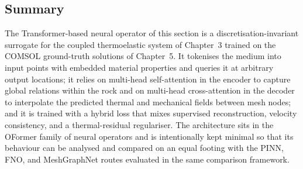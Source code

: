\subsection{Summary}

The Transformer-based neural operator of this section is a
discretisation-invariant surrogate for the coupled thermoelastic system
of Chapter~3 trained on the COMSOL ground-truth solutions of
Chapter~5. It tokenises the medium into input points with embedded
material properties and queries it at arbitrary output locations; it
relies on multi-head self-attention in the encoder to capture global
relations within the rock and on multi-head cross-attention in the
decoder to interpolate the predicted thermal and mechanical fields
between mesh nodes; and it is trained with a hybrid loss that mixes
supervised reconstruction, velocity consistency, and a thermal-residual
regulariser. The architecture sits in the OFormer family of neural
operators and is intentionally kept minimal so that its behaviour can
be analysed and compared on an equal footing with the PINN, FNO, and
MeshGraphNet routes evaluated in the same comparison framework.
